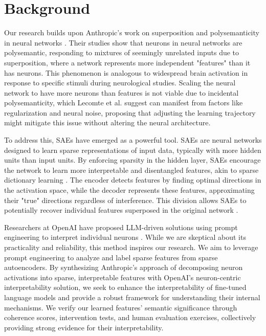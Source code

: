 \section{Background}

Our research builds upon Anthropic's work on superposition and polysemanticity in neural networks \cite{bricken2023monosemanticity, templeton2024scaling, elhage2021mathematical, elhage2022superposition}. Their studies show that neurons in neural networks are polysemantic, responding to mixtures of seemingly unrelated inputs due to superposition, where a network represents more independent "features" than it has neurons. This phenomenon is analogous to widespread brain activation in response to specific stimuli during neurological studies. Scaling the neural network to have more neurons than features is not viable due to incidental polysemanticity, which Lecomte et al. \cite{lecomte2024causespolysemanticity} suggest can manifest from factors like regularization and neural noise, proposing that adjusting the learning trajectory might mitigate this issue without altering the neural architecture.

To address this, SAEs have emerged as a powerful tool. SAEs are neural networks designed to learn sparse representations of input data, typically with more hidden units than input units. By enforcing sparsity in the hidden layer, SAEs encourage the network to learn more interpretable and disentangled features, akin to sparse dictionary learning \cite{cunningham2023sparseautoencoders}. The encoder detects features by finding optimal directions in the activation space, while the decoder represents these features, approximating their "true" directions regardless of interference. This division allows SAEs to potentially recover individual features superposed in the original network \cite{bricken2023monosemanticity}.

Researchers at OpenAI have proposed LLM-driven solutions using prompt engineering to interpret individual neurons \cite{bills2023language}. While we are skeptical about its practicality and reliability, this method inspires our research. We aim to leverage prompt engineering to analyze and label sparse features from sparse autoencoders. By synthesizing Anthropic's approach of decomposing neuron activations into sparse, interpretable features with OpenAI's neuron-centric interpretability solution, we seek to enhance the interpretability of fine-tuned language models and provide a robust framework for understanding their internal mechanisms. We verify our learned features' semantic significance through coherence scores, intervention tests, and human evaluation exercises, collectively providing strong evidence for their interpretability.

